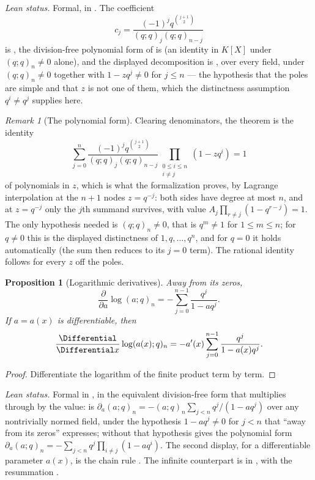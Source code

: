 \documentclass[11pt,a4paper,oneside,openany]{book}
\newtheorem{proposition}[proposition]{Proposition}
\theoremstyle{definition}
\theoremstyle{remark}
\newtheorem{remark}[remark]{Remark}
\begin{document}
\emph{Lean status.}  Formal, in .  The coefficient
\[
c_j=\frac{(-1)^jq^{\binom{j+1}{2}}}{(q;q)_j(q;q)_{n-j}}
\]
is , the
division-free polynomial form of  is
 (an identity in $K[X]$ under
$(q;q)_n\ne0$ alone), and the displayed decomposition is
, over every field, under $(q;q)_n\ne0$ together
with $1-zq^j\ne0$ for $j\le n$ --- the hypothesis that the poles are simple and that $z$ is not
one of them, which the distinctness assumption $q^i\ne q^j$ supplies here.


\begin{remark}[The polynomial form]\label{rem:partial-fraction-formalization}
Clearing denominators, the theorem is the identity
\[
 \sum_{j=0}^{n}
 \frac{(-1)^jq^{\binom{j+1}{2}}}{(q;q)_j(q;q)_{n-j}}
 \prod_{\substack{0\le i\le n\\ i\ne j}}(1-zq^i)=1
\]
of polynomials in $z$, which is what the formalization proves, by Lagrange
interpolation at the $n+1$ nodes $z=q^{-j}$: both sides have degree at most
$n$, and at $z=q^{-j}$ only the $j$th summand survives, with value
$A_j\prod_{r\ne j}(1-q^{r-j})=1$.  The only hypothesis needed is
$(q;q)_n\ne0$, that is $q^m\ne1$ for $1\le m\le n$; for $q\ne0$ this is the
displayed distinctness of $1,q,\ldots,q^n$, and for $q=0$ it holds
automatically (the sum then reduces to its $j=0$ term).  The rational
identity follows for every $z$ off the poles.
\end{remark}

\begin{proposition}[Logarithmic derivatives]\label{prop:logder-finite}
Away from its zeros,
\[
 \frac{\partial}{\partial a}\log(a;q)_n
 =-\sum_{j=0}^{n-1}\frac{q^j}{1-aq^j}.
\]
If $a=a(x)$ is differentiable, then
\[
 \frac{\Differential}{\Differential x}\log(a(x);q)_n
 =-a'(x)\sum_{j=0}^{n-1}\frac{q^j}{1-a(x)q^j}.
\]
\end{proposition}

\begin{proof}
Differentiate the logarithm of the finite product term by term.
\end{proof}

\emph{Lean status.}  Formal in , in the equivalent
division-free form that multiplies through by the value:
 is
$\partial_a(a;q)_n=-(a;q)_n\sum_{j<n}q^j/(1-aq^j)$ over any nontrivially normed field, under the
hypothesis $1-aq^j\ne0$ for $j<n$ that ``away from its zeros'' expresses; without that hypothesis
 gives the polynomial form
$\partial_a(a;q)_n=-\sum_{j<n}q^j\prod_{i\ne j}(1-aq^i)$.  The second display, for a
differentiable parameter $a(x)$, is the chain rule
.  The infinite counterpart is
 in , with
the resummation .
\end{document}
